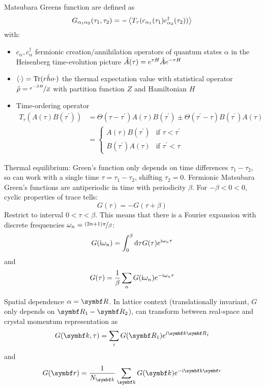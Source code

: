 \documentclass[../notes.tex]{subfiles}
\begin{document}
Matsubara Greens function are defined as
\begin{equation}
	G_{\alpha_1 \alpha_2} (\tau_1, \tau_2) = - \Braket{T_{\tau} (c_{\alpha_1}(\tau_1) c^{\dagger}_{\alpha_2} (\tau_2))}
\end{equation}
with:
\begin{itemize}
	\item \(c_{\alpha}, c^{\dagger}_{\alpha}\) fermionic creation/annihilation operators of quantum states \(\alpha\) in the Heisenberg time-evolution picture \(\hat{A} (\tau) = e^{\tau H} \hat{A} e^{-\tau H}\)
	\item \(\braket{\cdot} = \operatorname{Tr}(\hat{rho} \cdot)\) the thermal expectation value with statistical operator \(\hat{\rho} = \nicefrac{e^{-\beta H}}{Z}\) with partition function \(Z\) and Hamiltonian \(H\)
	\item Time-ordering operator
	\begin{align}
		T_{\tau} (A(\tau) B(\tau^{\prime})) &= \Theta(\tau - \tau^{\prime}) A(\tau) B(\tau^{\prime}) \pm \Theta(\tau^{\prime} - \tau) B(\tau^{\prime}) A(\tau) \\
		&= \begin{cases}
			A (\tau) B(\tau^{\prime}) & \text{if } \tau < \tau^{\prime} \\
			B(\tau^{\prime}) A (\tau) & \text{if } \tau^{\prime} < \tau
		\end{cases}
	\end{align}
\end{itemize}
Thermal equilibrium: Green's function only depends on time differences \(\tau_1 - \tau_2\), so can work with a single time \(\tau = \tau_1 - \tau_2\), shifting \(\tau_2 = 0\).
Fermionic Matsubara Green's functions are antiperiodic in time with periodicity \(\beta\). For \(-\beta < 0 < 0\), cyclic properties of trace tells:
\begin{equation}
	G (\tau) = - G (\tau + \beta)
\end{equation}
Restrict to interval \(0 < \tau < \beta\).
This means that there is a Fourier expansion with discrete frequencies \(\omega_n = \nicefrac{(2n + 1)\pi}{\beta}\):
\begin{equation}
	G (\iu \omega_n) = \int_{0}^{\beta} \odif{\tau} G (\tau) e^{\iu \omega_n \tau}
\end{equation}
and
\begin{equation}
	G (\tau) = \frac{1}{\beta} \sum_{n} G(\mathrm{i} \omega_n) e^{-\mathrm{i} \omega_n \tau}
\end{equation}

Spatial dependence \(\alpha = \vb{R}\).
In lattice context (translationally invariant, \(G\) only depends on \(\vb{R}_1 - \vb{R}_2\)), can transform between real-space and crystal momentum representation as 
\begin{equation}
	G (\vb{k}, \tau) = \sum_i G(\vb{R}_1) e^{\iu \vb{k} \vb{R}_j}
\end{equation}
and
\begin{equation}
	G(\vb{r}) = \frac{1}{N_{\vb{k}}} \sum_{\vb{k}} G(\vb{k}) e^{-\iu \vb{k} \vb{r}}
\end{equation}
\end{document}
